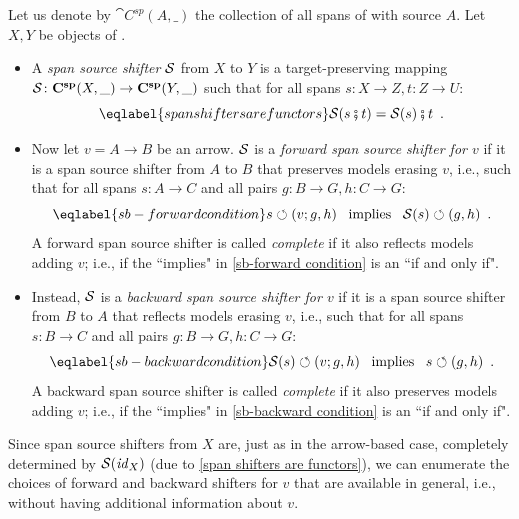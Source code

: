 \begin{definition}\label{def:sb-shifters}
Let us denote by $\cat{C^{sp}}(A,\_)$ the collection of all spans of  with source $A$. Let $X,Y$ be objects of . 
\begin{itemize}[topsep=\smallskipamount]
\item A \emph{span source shifter} $\mathcal{S}$ from $X$ to $Y$ is a target-preserving mapping $\mathcal{S} \colon \mathbf{C^{sp}}(X,\_) \rightarrow \mathbf{C^{sp}}(Y, \_)$
such that for all spans $s:X\to Z,t:Z\to U$:
%
\begin{equation}\eqlabel{span shifters are functors}
\cS(s \spcomp t) = \cS(s)\spcomp t \enspace.
\end{equation}
%
\item Now let $v=A\to B$ be an arrow. $\mathcal{S}$ is a \emph{forward span source shifter for $v$} if it is a span source shifter from $A$ to $B$ that preserves models erasing $v$, i.e., such that for all spans $s:A\to C$ and all pairs $g:B\to G,h:C \to G$:
%
\begin{equation}\eqlabel{sb-forward condition}
s\commutes (v;g,h) \enspace\text{ implies }\enspace \cS(s) \commutes (g,h) \enspace.
\end{equation}
%
A forward span source shifter is called \emph{complete} if it also reflects models adding $v$; i.e., if the ``implies" in \eqref{sb-forward condition} is an ``if and only if".

\item Instead, $\mathcal{S}$ is a \emph{backward span source shifter for $v$} if it is a span source shifter from $B$ to $A$ that reflects models erasing $v$, i.e., such that for all spans $s:B\to C$ and all pairs $g:B\to G,h:C\to G$:
%
\begin{equation}\eqlabel{sb-backward condition}
\cS(s) \commutes (v;g,h) \enspace\text{ implies }\enspace s\commutes (g,h) \enspace.
\end{equation}
%
A backward span source shifter is called \emph{complete} if it also preserves models adding $v$; i.e., if the ``implies" in \eqref{sb-backward condition} is an ``if and only if".
\end{itemize}
\end{definition}
%
Since span source shifters from $X$ are, just as in the arrow-based case, completely determined by $\mathcal{S}(\mathit{id}_X)$ (due to \eqref{span shifters are functors}), we can enumerate the choices of forward and backward shifters for $v$ that are available in general, i.e., without having additional information about $v$.
